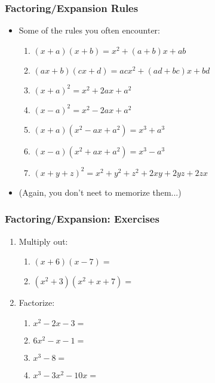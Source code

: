 \documentclass[pdflatex, 12pt]{beamer}
\begin{document}
\begin{frame}
\frametitle{Factoring/Expansion Rules}
\begin{itemize}
\item Some of the rules you often encounter:
 \begin{enumerate} 
 \item $(x + a)(x + b) = x^2 + (a + b)x + ab$
 \item $(ax + b)(cx + d) = acx^2 + (ad + bc)x + bd$
 \item $(x + a)^2 = x^2 + 2ax + a^2$
 \item $(x - a)^2 = x^2 - 2ax + a^2$
 \item $(x + a)(x^2 - ax + a^2) = x^3 + a^3$
 \item $(x - a)(x^2 + ax + a^2) = x^3 - a^3$
 \item $(x + y + z)^2 = x^2 + y^2 + z^2 + 2xy + 2yz + 2zx$
 \end{enumerate}
\vspace{0.4cm}
\item (Again, you don't neet to memorize them...)
\end{itemize}
\end{frame}

\begin{frame}
\frametitle{Factoring/Expansion: Exercises}
\begin{enumerate}
\item Multiply out:
 \begin{enumerate}
 \item $(x + 6)(x - 7) = $
 \item $(x^2 + 3)(x^2 + x + 7) = $
 \end{enumerate}
\vspace{0.4cm}
\item Factorize:
 \begin{enumerate}
 \item $x^2 - 2x - 3 = $
 \item $6x^2 - x - 1 = $
 \item $x^3 - 8 = $
 \item $x^3 - 3x^2 - 10x = $
 \end{enumerate}
\end{enumerate}
\end{frame}
\end{document}
